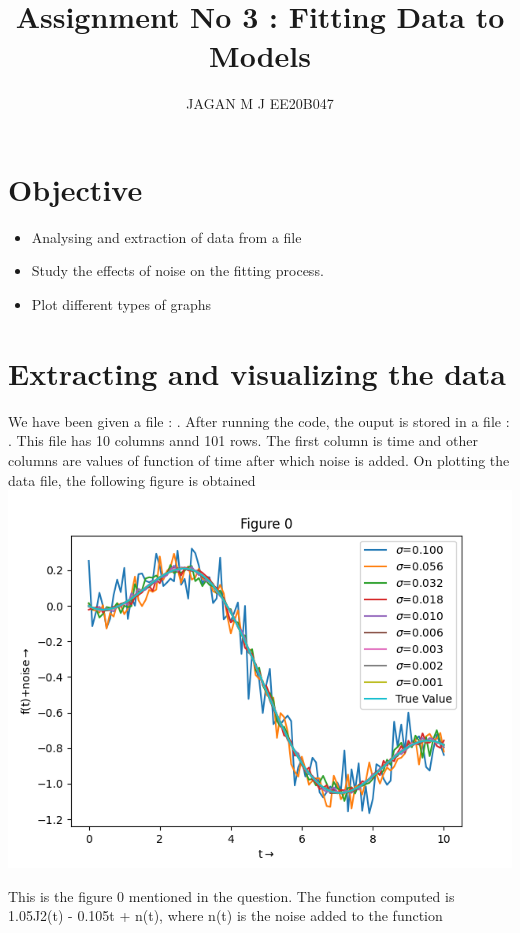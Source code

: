 \documentclass[10pt,a4paper]{article}
\begin{document}
\title{Assignment No 3 : Fitting Data to Models}
\author{JAGAN M J EE20B047}
\maketitle

\section{Objective}
\begin{itemize}
\item Analysing and extraction of data from a file
\item Study the effects of noise on the fitting process.
\item Plot different types of graphs
\end{itemize}



\section{Extracting and visualizing the data}

We have been given a file : \textit{}. After running the code, the ouput is stored in a file : \textit{}. This file has 10 columns annd 101 rows. The first column is time and other columns are values of function of time after which noise is added. On plotting the data file, the following figure is obtained
\includegraphics{figure_1.png}



This is the figure 0 mentioned in the question. The function computed is 1.05J2(t) - 0.105t + n(t), where n(t) is the noise added to the function 
\end{document}
